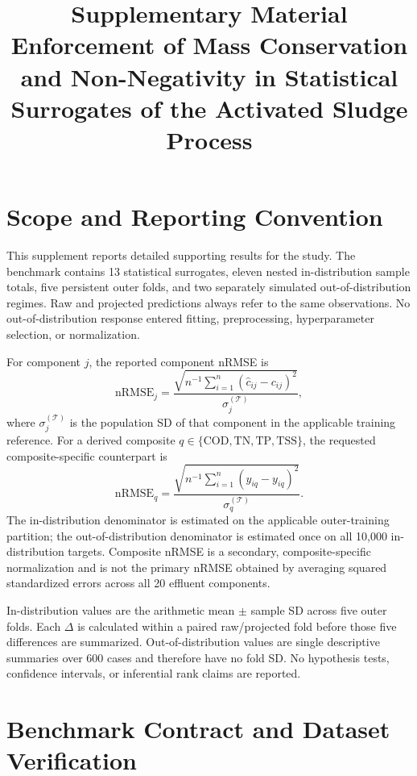 \documentclass[a4paper,10pt]{article}
\title{Supplementary Material\\Enforcement of Mass Conservation and Non-Negativity in Statistical Surrogates of the Activated Sludge Process}
\author{}
\date{}
\begin{document}
\maketitle

\section{Scope and Reporting Convention}

This supplement reports detailed supporting results for the study. The benchmark contains 13 statistical surrogates, eleven nested in-distribution sample totals, five persistent outer folds, and two separately simulated out-of-distribution regimes. Raw and projected predictions always refer to the same observations. No out-of-distribution response entered fitting, preprocessing, hyperparameter selection, or normalization.

For component $j$, the reported component nRMSE is
\begin{equation}
\mathrm{nRMSE}_j=
\frac{\sqrt{n^{-1}\sum_{i=1}^{n}(\hat c_{ij}-c_{ij})^2}}
{\sigma_j^{(\mathcal T)}},
\end{equation}
where $\sigma_j^{(\mathcal T)}$ is the population SD of that component in the applicable training reference. For a derived composite $q\in\{\mathrm{COD},\mathrm{TN},\mathrm{TP},\mathrm{TSS}\}$, the requested composite-specific counterpart is
\begin{equation}
\mathrm{nRMSE}_q=
\frac{\sqrt{n^{-1}\sum_{i=1}^{n}(\hat y_{iq}-y_{iq})^2}}
{\sigma_q^{(\mathcal T)}}.
\end{equation}
The in-distribution denominator is estimated on the applicable outer-training partition; the out-of-distribution denominator is estimated once on all 10,000 in-distribution targets. Composite nRMSE is a secondary, composite-specific normalization and is not the primary nRMSE obtained by averaging squared standardized errors across all 20 effluent components.

In-distribution values are the arithmetic mean $\pm$ sample SD across five outer folds. Each $\Delta$ is calculated within a paired raw/projected fold before those five differences are summarized. Out-of-distribution values are single descriptive summaries over 600 cases and therefore have no fold SD. No hypothesis tests, confidence intervals, or inferential rank claims are reported.

\section{Benchmark Contract and Dataset Verification}
\end{document}
